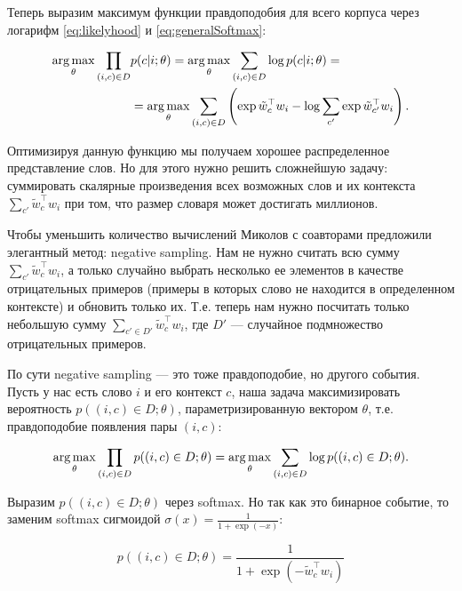 \bigskip
Теперь выразим максимум функции правдоподобия для всего корпуса через логарифм \ref{eq:likelyhood} и
\ref{eq:generalSoftmax}:

\begin{equation}
\begin{aligned}
 \operatorname*{arg\,max}_{\theta} \prod_{(i,c)\in D} & p(c|i;\theta) = \operatorname*{arg\,max}_{\theta} \sum_{(i,c)\in D}\log{p(c|i;\theta)} =
\\
 & = \operatorname*{arg\,max}_{\theta} \sum_{(i,c)\in D} \left(\exp{\tilde{w}_c^\top w_i} - \log{\sum_{c'}
\exp{\tilde{w}_{c'}^\top w_i}}\right).
\end{aligned}
\end{equation}

Оптимизируя данную функцию мы получаем хорошее распределенное представление слов. Но для этого нужно решить
сложнейшую задачу: суммировать скалярные произведения всех возможных слов и их контекста $\sum_{c'}
\tilde{w}_c^\top w_i$ при том, что размер словаря может достигать миллионов.

\bigskip
Чтобы уменьшить количество вычислений Миколов с соавторами \cite{Mikolov:2} предложили элегантный метод:
negative sampling. Нам не нужно считать всю сумму $\sum_{c'} \tilde{w}_c^\top w_i$, а только случайно выбрать
несколько ее элементов в качестве отрицательных примеров (примеры в которых слово не находится в определенном
контексте) и обновить только их. Т.е. теперь нам нужно посчитать только небольшую сумму $\sum_{c' \in D'}
\tilde{w}_c^\top w_i$, где $D'$ --- случайное подмножество отрицательных примеров.

\bigskip
По сути negative sampling --- это тоже правдоподобие, но другого события. Пусть у нас есть слово $i$ и его
контекст $c$, наша задача максимизировать вероятность $p((i,c) \in D; \theta)$, параметризированную вектором
$\theta$, т.е. правдоподобие появления пары $(i,c)$:

\begin{equation}
 \operatorname*{arg\,max}_{\theta} \prod_{(i,c)\in D} p((i,c)\in D;\theta) = \operatorname*{arg\,max}_{\theta} \sum_{(i,c)\in D} \log{
p((i,c)\in D;\theta)}.
\end{equation}

Выразим $p((i,c)\in D;\theta)$ через softmax. Но так как это бинарное событие, то заменим softmax сигмоидой
$\sigma (x) = \frac{1}{1+\exp{(-x)}}$:

\begin{equation}
 p((i,c)\in D;\theta) = \frac{1}{1+\exp{(-\tilde{w}_c^{\top} w_i)}}
\end{equation}

